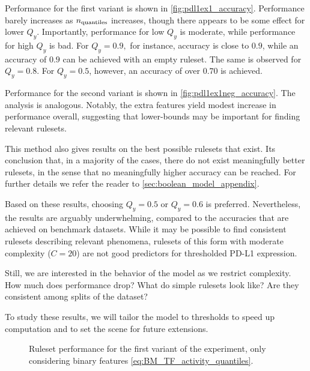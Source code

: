 Performance for the first variant is shown in \autoref{fig:pdl1ex1_accuracy}.
Performance barely increases as $n_{\text{quantiles}}$ increases, though there appears to be some effect for lower $Q_y$.
Importantly, performance for low $Q_y$ is moderate, while performance for high $Q_y$ is bad.
For $Q_y = 0.9,$ for instance, accuracy is close to $0.9$,
while an accuracy of $0.9$ can be achieved with an empty ruleset.
The same is observed for $Q_y = 0.8$.
For $Q_y = 0.5$, however, an accuracy of over $0.70$ is achieved.

Performance for the second variant is shown in \autoref{fig:pdl1ex1neg_accuracy}.
The analysis is analogous.
Notably, the extra features yield modest increase in performance overall,
suggesting that lower-bounds may be important for finding relevant rulesets.

This method also gives results on the best possible rulesets that exist.
Its conclusion that, in a majority of the cases, there do not exist meaningfully better rulesets,
in the sense that no meaningfully higher accuracy can be reached.
For further details we refer the reader to \autoref{sec:boolean_model_appendix}.

Based on these results, choosing $Q_y = 0.5 $ or $Q_y = 0.6$ is preferred.
Nevertheless, the results are arguably underwhelming,
compared to the accuracies that are achieved on benchmark datasets.
While it may be possible to find consistent rulesets describing relevant phenomena,
rulesets of this form with moderate complexity ($C=20$) are not good predictors for thresholded PD-L1 expression.

Still, we are interested in the behavior of the model as we restrict complexity.
How much does performance drop?
What do simple rulesets look like?
Are they consistent among splits of the dataset?

To study these results, we will tailor the model to thresholds to speed up computation
and to set the scene for future extensions.


\begin{figure}[h]
    \centering
    
    \caption{Ruleset performance for the first variant of the experiment,
        only considering binary features \eqref{eq:BM_TF_activity_quantiles}.}
    \label{fig:pdl1ex1_accuracy}
\end{figure}

%    

